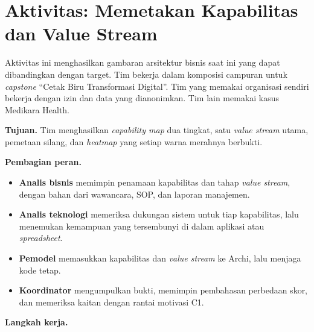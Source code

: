 \section{Aktivitas: Memetakan Kapabilitas dan Value Stream}

Aktivitas ini menghasilkan gambaran arsitektur bisnis saat ini yang dapat dibandingkan dengan target. Tim bekerja
dalam komposisi campuran untuk \textit{capstone} ``Cetak Biru Transformasi Digital''. Tim yang memakai organisasi
sendiri bekerja dengan izin dan data yang dianonimkan. Tim lain memakai kasus Medikara Health.

\textbf{Tujuan.} Tim menghasilkan \textit{capability map} dua tingkat, satu \textit{value stream} utama, pemetaan
silang, dan \textit{heatmap} yang setiap warna merahnya berbukti.

\textbf{Pembagian peran.}

\begin{itemize}
  \item \textbf{Analis bisnis} memimpin penamaan kapabilitas dan tahap \textit{value stream}, dengan bahan dari
        wawancara, SOP, dan laporan manajemen.
  \item \textbf{Analis teknologi} memeriksa dukungan sistem untuk tiap kapabilitas, lalu menemukan kemampuan yang
        tersembunyi di dalam aplikasi atau \textit{spreadsheet}.
  \item \textbf{Pemodel} memasukkan kapabilitas dan \textit{value stream} ke Archi, lalu menjaga kode tetap.
  \item \textbf{Koordinator} mengumpulkan bukti, memimpin pembahasan perbedaan skor, dan memeriksa kaitan dengan
        rantai motivasi C1.
\end{itemize}

\textbf{Langkah kerja.}

